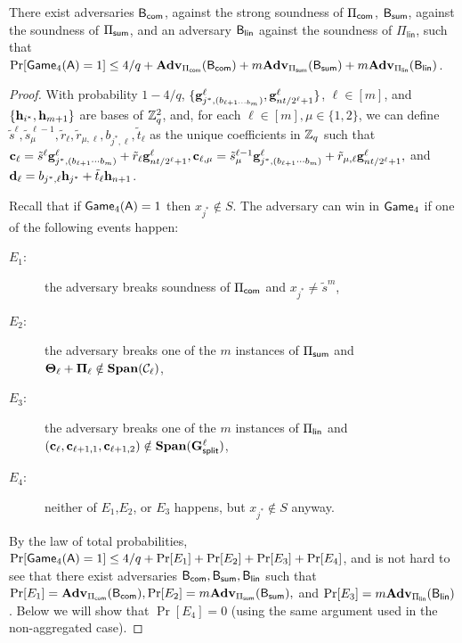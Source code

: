 \begin{lemma}
There exist adversaries \(\mathsf{B}_{\mathsf{com}}\), against the strong soundness of \(\Pi_{\mathsf{com}}\), \(\mathsf{B}_{\mathsf{sum}}\), against the soundness of \(\Pi_{\mathsf{sum}}\), and an adversary \(\mathsf{B}_\mathsf{lin}\) against the soundness of \(\Pi_\mathsf{lin}\), such that \(\Pr[\mathsf{Game}_4(\mathsf{A})=1]\leq 4/q+ \mathbf{Adv}_{\Pi_{\mathsf{com}}}(\mathsf{B}_{\mathsf{com}})+m\mathbf{Adv}_{\Pi_{\mathsf{sum}}}(\mathsf{B}_{\mathsf{sum}})+m\mathbf{Adv}_{\Pi_\mathsf{lin}}(\mathsf{B}_\mathsf{lin})\).
\end{lemma}
\begin{proof}
With probability \(1-4/q\), \(\{\mathbf{g}_{j^*,(b_{\ell+1\cdots b_m})}^\ell,\mathbf{g}_{nt /2^\ell+1}^\ell\}\), \(\ell\in [m]\), and \(\{\mathbf{h}_{i^*},\allowbreak \mathbf{h}_{m+1}\}\) are bases of \(\mathbb{Z}_q^2\),
and, for each \(\ell\in [m],\mu\in\{1,2\}\), we can define \(\tilde{s}^\ell,\tilde{s}^{\ell-1}_\mu,\tilde{r}_\ell,\tilde{r}_{\mu,\ell},b_{j^*,\ell},\tilde{t}_\ell\) as the unique coefficients in \(\mathbb{Z}_q\) such that \(\mathbf{c}_\ell=\allowbreak \tilde{s}^\ell\mathbf{g}_{j^*,(b_{\ell+1}\cdots b_m)}^\ell + \tilde{r}_\ell \mathbf{g}_{nt /2^\ell+1}^\ell, \mathbf{c}_{\ell,\mu}=\tilde{s}^{\ell-1}_\mu\mathbf{g}_{j^*,(b_{\ell+1}\cdots b_m)}^\ell + \tilde{r}_{\mu,\ell} \mathbf{g}_{nt /2^\ell+1}^\ell,\) and \(\mathbf{d}_\ell= b_{j^*,\ell} \mathbf{h}_{j^*} + \tilde{t}_\ell \mathbf{h}_{n+1}\).

Recall that if \(\mathsf{Game}_4(\mathsf{A})=1\) then \(x_{j^*}\notin S\). The adversary can win in \(\mathsf{Game}_4\) if one of the following events happen:
\begin{description}
\item[\(E_1\):] the adversary breaks soundness of \(\Pi_{\mathsf{com}}\) and \(x_{j^*}\neq \tilde{s}^m\),
\item[\(E_2\):] the adversary breaks one of the \(m\)  instances of \(\Pi_{\mathsf{sum}}\) and \(\mathbf{{\Theta}}_\ell+\mathbf{{\Pi}}_\ell\notin\mathbf{Span}(\mathcal{C}_\ell)\),
\item[\(E_3\):] the adversary breaks one of the \(m\) instances of \(\Pi_{\mathsf{lin}}\) and \((\mathbf{c}_{\ell},\mathbf{c}_{\ell+1,1},\mathbf{c}_{\ell+1,2})\notin\mathbf{Span}(\mathbf{{G}}_\mathsf{split}^\ell)\),
\item[\(E_4\):] neither of \(E_1\),\(E_2\), or \(E_3\) happens, but \(x_{j^*}\notin S\) anyway.
\end{description}
By the law of total probabilities, \(\Pr[\mathsf{Game}_4(\mathsf{A})=1]\leq 4/q+\Pr[E_1]+\Pr[E_2]+\Pr[E_3]+\Pr[E_4]\), and is not hard to see that there exist adversaries \(\mathsf{B}_{\mathsf{com}},\mathsf{B}_{\mathsf{sum}},\mathsf{B}_\mathsf{lin}\) such that \(\Pr[E_1]=\mathbf{Adv}_{\Pi_{\mathsf{com}}}(\mathsf{B}_{\mathsf{com}}),\Pr[E_2]=m\mathbf{Adv}_{\Pi_{\mathsf{sum}}}(\mathsf{B}_{\mathsf{sum}}),\) and \(\Pr[E_3]=m\mathbf{Adv}_{\Pi_\mathsf{lin}}(\mathsf{B}_\mathsf{lin})\). Below we will show that \(\Pr[E_4]=0\) (using the same argument used in the non-aggregated case).


\end{proof}
